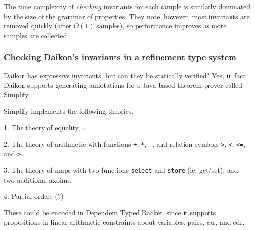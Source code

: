 The time complexity of \emph{checking} invariants for each sample
is similarly dominated by the size of the grammar of properties.
They note, however, most invariants are removed quickly (after
$O(1)$ samples), so performance improves as more samples
are collected.

\subsubsection{Checking Daikon's invariants in a refinement type system}

Daikon has expressive invariants, but can they be statically verified?
Yes, in fact Daikon supports generating annotations for a Java-based
theorem prover called Simplify~\cite{Detlefs03simplifya}.

Simplify implements the following theories.

1. The theory of equality, \texttt{=}

2. The theory of arithmetic with functions \texttt{+}, \texttt{*}, \texttt{-},
   and relation symbols \texttt{>}, \texttt{<}, \texttt{<=}, and \texttt{>=}.

3. The theory of maps with two functions \texttt{select} and \texttt{store} (ie. get/set),
   and two additional axoims.

4. Partial orders (?)

These could be encoded in Dependent Typed Racket, since it supports propositions
in linear arithmetic constraints about variables, pairs, car, and cdr.


